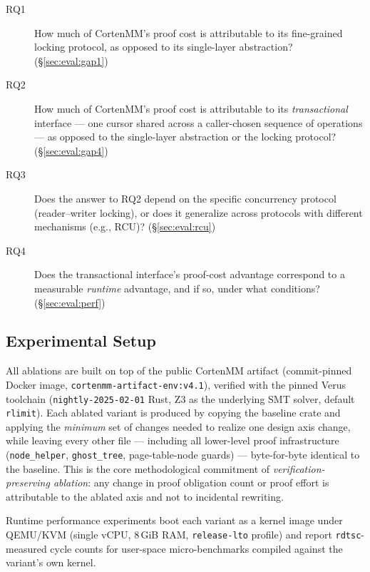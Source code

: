 \documentclass[10pt]{article}
\begin{document}
\begin{description}
  \item[RQ1] How much of CortenMM's proof cost is attributable to its
    fine-grained locking protocol, as opposed to its single-layer
    abstraction? (\S\ref{sec:eval:gap1})
  \item[RQ2] How much of CortenMM's proof cost is attributable to its
    \emph{transactional} interface --- one cursor shared across a
    caller-chosen sequence of operations --- as opposed to the
    single-layer abstraction or the locking protocol?
    (\S\ref{sec:eval:gap4})
  \item[RQ3] Does the answer to RQ2 depend on the specific concurrency
    protocol (reader--writer locking), or does it generalize across
    protocols with different mechanisms (e.g., RCU)?
    (\S\ref{sec:eval:rcu})
  \item[RQ4] Does the transactional interface's proof-cost advantage
    correspond to a measurable \emph{runtime} advantage, and if so,
    under what conditions? (\S\ref{sec:eval:perf})
\end{description}

\subsection{Experimental Setup}
\label{sec:eval:setup}

All ablations are built on top of the public CortenMM artifact
(commit-pinned Docker image, \texttt{cortenmm-artifact-env:v4.1}),
verified with the pinned Verus toolchain
(\texttt{nightly-2025-02-01} Rust,
Z3 as the underlying SMT solver, default \texttt{rlimit}). Each ablated
variant is produced by copying the baseline crate and applying the
\emph{minimum} set of changes needed to realize one design axis change,
while leaving every other file --- including all lower-level proof
infrastructure (\texttt{node\_helper}, \texttt{ghost\_tree},
page-table-node guards) --- byte-for-byte identical to the baseline.
This is the core methodological commitment of \emph{verification-preserving
ablation}: any change in proof obligation count or proof effort is
attributable to the ablated axis and not to incidental rewriting.

Runtime performance experiments boot each variant as a kernel image
under QEMU/KVM (single vCPU, 8\,GiB RAM, \texttt{release-lto} profile)
and report \texttt{rdtsc}-measured cycle counts for user-space
micro-benchmarks compiled against the variant's own kernel.
\end{document}
